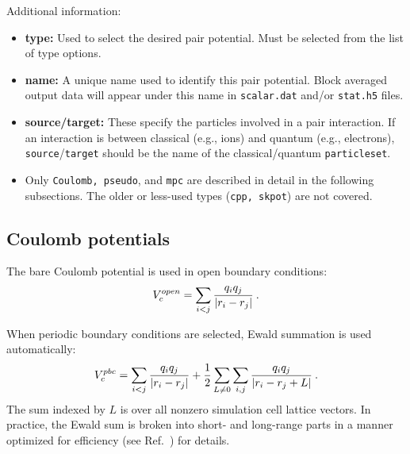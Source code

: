 Additional information:
\begin{itemize}
  \item{\textbf{type:} Used to select the desired pair potential.  Must be selected from the list of type options.}
  \item{\textbf{name:} A unique name used to identify this pair potential.  Block averaged output data will appear under this name in \texttt{scalar.dat} and/or \texttt{stat.h5} files.}
  \item{\textbf{source/target:}  These specify the particles involved in a pair interaction.  If an interaction is between classical (e.g., ions) and quantum (e.g., electrons), \texttt{source}/\texttt{target} should be the name of the classical/quantum \texttt{particleset}.}
  \item{Only \texttt{Coulomb, pseudo}, and \texttt{mpc} are described in detail in the following subsections.  The older or less-used types (\texttt{cpp, skpot}) are not covered.}
\end{itemize}







\subsection{Coulomb potentials}

The bare Coulomb potential is used in open boundary conditions:
\begin{align}
  V_c^{open} = \sum_{i<j}\frac{q_iq_j}{\lvert r_i-r_j \rvert}\:.
\end{align}

When periodic boundary conditions are selected, Ewald summation is used automatically:
\begin{align}\label{eq:ewald}
  V_c^{pbc} = \sum_{i<j}\frac{q_iq_j}{\lvert r_i-r_j \rvert} + \frac{1}{2}\sum_{L\ne0}\sum_{i,j}\frac{q_iq_j}{\lvert r_i-r_j+L \rvert}\:.
\end{align}
The sum indexed by $L$ is over all nonzero simulation cell lattice vectors.  In practice, the Ewald sum is broken into short- and long-range parts in a manner optimized for efficiency (see Ref.~\cite{Natoli1995}) for details. 

